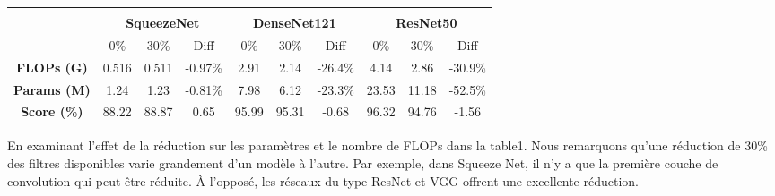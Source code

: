 \documentclass[12pt]{article}
\begin{document}
\begin{table}[H]
\begin{tabular}{cccccccccc}
	\multicolumn{1}{l}{}                    & \multicolumn{1}{l}{}      & \multicolumn{1}{l}{}      & \multicolumn{1}{l}{}                                & \multicolumn{1}{l}{}      & \multicolumn{1}{l}{}      & \multicolumn{1}{l}{}                                & \multicolumn{1}{l}{}      & \multicolumn{1}{l}{}      & \multicolumn{1}{l}{}                               \\
	& \multicolumn{3}{c}{\textbf{SqueezeNet}}                                                                     & \multicolumn{3}{c}{\textbf{DenseNet121}}                                                                    & \multicolumn{3}{c}{\textbf{ResNet50}}                                                                      \\
	& 0\%                       & 30\%                      & Diff                                                & 0\%                       & 30\%                      & Diff                                                & 0\%                       & 30\%                      & Diff                                               \\ \cline{2-10} 
	\multicolumn{1}{c|}{\textbf{FLOPs (G)}}  & 0.516                     & 0.511                     & \multicolumn{1}{c|}{{\color[HTML]{009901} -0.97\%}} & 2.91                      & 2.14                      & \multicolumn{1}{c|}{{\color[HTML]{009901} -26.4\%}} & 4.14                      & 2.86                      & {\color[HTML]{009901} -30.9\%}                     \\
	\multicolumn{1}{c|}{\textbf{Params (M)}} & 1.24                      & 1.23                      & \multicolumn{1}{c|}{{\color[HTML]{009901} -0.81\%}} & 7.98                      & 6.12                      & \multicolumn{1}{c|}{{\color[HTML]{009901} -23.3\%}} & 23.53                     & 11.18                     & {\color[HTML]{009901} -52.5\%}                     \\
	\multicolumn{1}{c|}{\textbf{Score (\%)}} & 88.22                     & 88.87                     & \multicolumn{1}{c|}{{\color[HTML]{009901} 0.65}}    & 95.99                     & 95.31                     & \multicolumn{1}{c|}{{\color[HTML]{9A0000} -0.68}}   & 96.32                     & 94.76                     & {\color[HTML]{9A0000} -1.56}                      
\end{tabular}
\end{table}
\newpage
En examinant l’effet de la réduction sur les paramètres et le nombre de FLOPs dans la table1.  Nous remarquons qu'une réduction de 30\% des filtres disponibles varie grandement d’un modèle à l’autre. Par exemple, dans Squeeze Net, il n’y a que la première couche de convolution qui peut être réduite. À l’opposé, les réseaux du type ResNet et VGG offrent une excellente réduction. 
\end{document}
